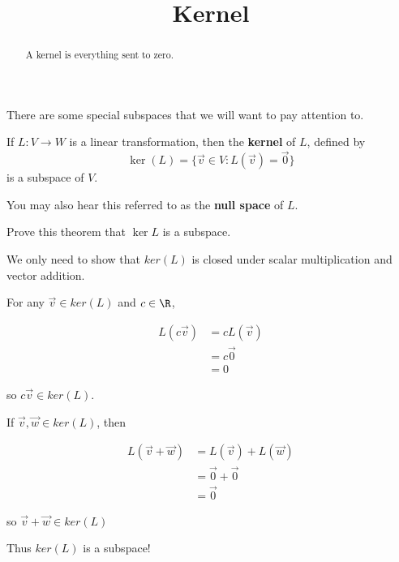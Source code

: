 \documentclass{ximera}
\title{Kernel}
\begin{document}
\begin{abstract}
	A kernel is everything sent to zero.
\end{abstract}

There are some special subspaces that we will want to pay attention to.

\begin{theorem}
  If $L:V \to W$ is a linear transformation, then the \textbf{kernel} of $L$, defined by $$\ker(L) = \{\vec{v} \in V:L(\vec{v}) = \vec{0}\}$$ is a subspace of $V$.
\end{theorem}

You may also hear this referred to as the \textbf{null space} of $L$.

Prove this theorem that $\ker L$ is a subspace.

\begin{free-response}
We only need to show that $ker(L)$ is closed under scalar multiplication and vector addition.

For any $\vec{v} \in ker(L)$ and $c \in \R$,

\begin{align*}
	L(c\vec{v}) &=cL(\vec{v})\\
		&=c\vec{0}\\
		&=0
\end{align*}

so $c\vec{v} \in ker(L)$.

If $\vec{v},\vec{w} \in ker(L)$, then

\begin{align*}
	L(\vec{v}+\vec{w}) &= L(\vec{v})+L(\vec{w})\\
	&= \vec{0}+\vec{0}\\
	&=\vec{0}
\end{align*}

so $\vec{v}+\vec{w} \in ker(L)$

Thus $ker(L)$ is a subspace!

\end{free-response}
\end{document}
